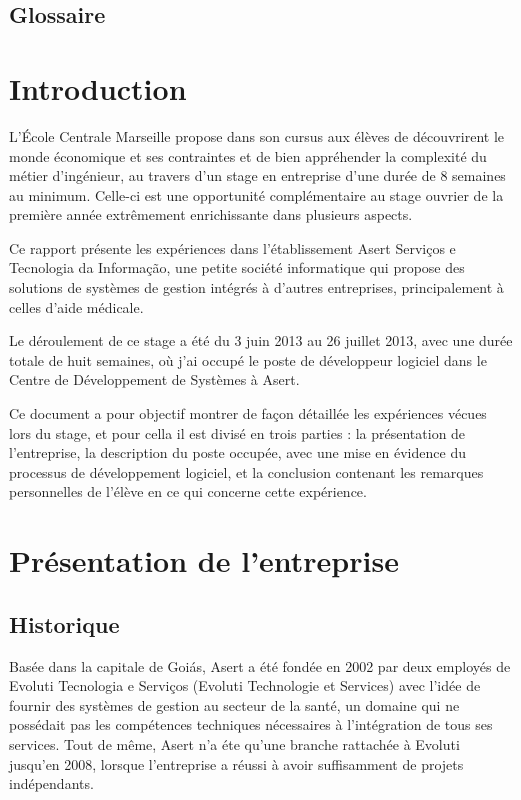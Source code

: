 \section*{Glossaire}
\tableofcontents

\chapter{Introduction}

L'École Centrale Marseille propose dans son cursus aux élèves de découvrirent le monde économique et ses contraintes et de bien appréhender la complexité du métier d'ingénieur, au travers d'un stage en entreprise d'une durée de 8 semaines au minimum. Celle-ci est une opportunité complémentaire au stage ouvrier de la première année extrêmement enrichissante dans plusieurs aspects. 

Ce rapport présente les expériences dans l'établissement Asert Serviços e Tecnologia da Informação, une petite société informatique qui propose des solutions de systèmes de gestion intégrés à d'autres entreprises, principalement à celles d'aide médicale.

Le déroulement de ce stage a été du 3 juin 2013 au 26 juillet 2013, avec une durée totale de huit semaines, où j'ai occupé le poste de développeur logiciel dans le Centre de Développement de Systèmes à Asert. 

Ce document a pour objectif montrer de façon détaillée les expériences vécues lors du stage, et pour cella il est divisé en trois parties :  la présentation de l'entreprise, la description du poste occupée, avec une mise en évidence du processus de développement logiciel, et la conclusion contenant les remarques personnelles de l'élève en ce qui concerne cette expérience.

\chapter{Présentation de l’entreprise}
\section{Historique}

Basée dans la capitale de Goiás, Asert a été fondée en 2002 par deux employés de Evoluti Tecnologia e Serviços (Evoluti Technologie et Services) avec l'idée de fournir des systèmes de gestion au secteur de la santé, un domaine qui ne possédait pas les compétences techniques nécessaires à l'intégration de tous ses services. Tout de même, Asert n'a éte qu'une branche rattachée à Evoluti jusqu'en 2008, lorsque l'entreprise a réussi à avoir suffisamment de projets indépendants.

